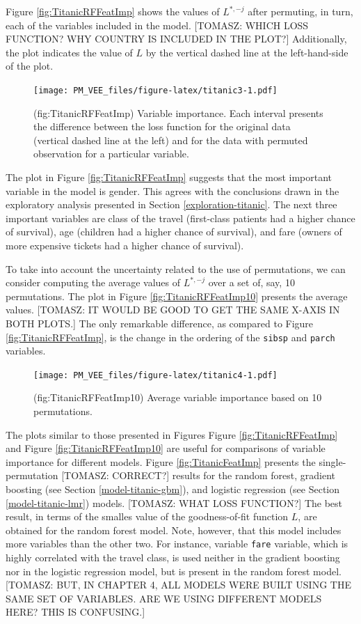 \documentclass[12pt,]{krantz}
\begin{document}
Figure \ref{fig:TitanicRFFeatImp} shows the values of \(L^{*,-j}\) after permuting, in turn, each of the variables included in the model. {[}TOMASZ: WHICH LOSS FUNCTION? WHY COUNTRY IS INCLUDED IN THE PLOT?{]} Additionally, the plot indicates the value of \(L\) by the vertical dashed line at the left-hand-side of the plot.

\begin{figure}
\centering
\texttt{[image: PM\_VEE\_files/figure-latex/titanic3-1.pdf]}
\caption{\label{fig:titanic3}(fig:TitanicRFFeatImp) Variable importance. Each interval presents the difference between the loss function for the original data (vertical dashed line at the left) and for the data with permuted observation for a particular variable.}
\end{figure}

The plot in Figure \ref{fig:TitanicRFFeatImp} suggests that the most important variable in the model is gender. This agrees with the conclusions drawn in the exploratory analysis presented in Section \ref{exploration-titanic}. The next three important variables are class of the travel (first-class patients had a higher chance of survival), age (children had a higher chance of survival), and fare (owners of more expensive tickets had a higher chance of survival).

To take into account the uncertainty related to the use of permutations, we can consider computing the average values of \(L^{*,-j}\) over a set of, say, 10 permutations. The plot in Figure \ref{fig:TitanicRFFeatImp10} presents the average values. {[}TOMASZ: IT WOULD BE GOOD TO GET THE SAME X-AXIS IN BOTH PLOTS.{]} The only remarkable difference, as compared to Figure \ref{fig:TitanicRFFeatImp}, is the change in the ordering of the \texttt{sibsp} and \texttt{parch} variables.

\begin{figure}
\centering
\texttt{[image: PM\_VEE\_files/figure-latex/titanic4-1.pdf]}
\caption{\label{fig:titanic4}(fig:TitanicRFFeatImp10) Average variable importance based on 10 permutations.}
\end{figure}

The plots similar to those presented in Figures Figure \ref{fig:TitanicRFFeatImp} and Figure \ref{fig:TitanicRFFeatImp10} are useful for comparisons of variable importance for different models.
Figure \ref{fig:TitanicFeatImp} presents the single-permutation {[}TOMASZ: CORRECT?{]} results for the random forest, gradient boosting (see Section \ref{model-titanic-gbm}), and logistic regression (see Section \ref{model-titanic-lmr}) models. {[}TOMASZ: WHAT LOSS FUNCTION?{]} The best result, in terms of the smalles value of the goodness-of-fit function \(L\), are obtained for the random forest model. Note, however, that this model includes more variables than the other two. For instance, variable \texttt{fare} variable, which is highly correlated with the travel class, is used neither in the gradient boosting nor in the logistic regression model, but is present in the random forest model. {[}TOMASZ: BUT, IN CHAPTER 4, ALL MODELS WERE BUILT USING THE SAME SET OF VARIABLES. ARE WE USING DIFFERENT MODELS HERE? THIS IS CONFUSING.{]}
\end{document}
